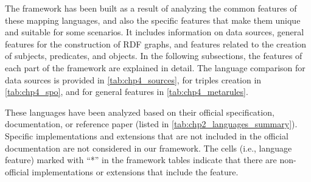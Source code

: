 The framework has been built as a result of analyzing the common features of these mapping languages, and also the specific features that make them unique and suitable for some scenarios. It includes information on data sources, general features for the construction of RDF graphs, and features related to the creation of subjects, predicates, and objects. In the following subsections, the features of each part of the framework are explained in detail. The language comparison for data sources is provided in \cref{tab:chp4_sources}, for triples creation in \cref{tab:chp4_spo}, and for general features in \cref{tab:chp4_metarules}. 

These languages have been analyzed based on their official specification, documentation, or reference paper (listed in \cref{tab:chp2_languages_summary}). Specific implementations and extensions that are not included in the official documentation are not considered in our framework. The cells (i.e., language feature) marked with ``*''  in the framework tables indicate that there are non-official implementations or extensions that include the feature.




